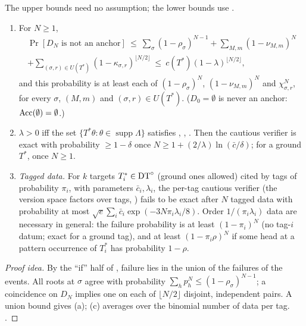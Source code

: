 \begin{theorem}\label{thm:single:rates}
The upper bounds need no assumption; the lower bounds use \Rich.
\begin{enumerate}[label=(\alph*)]
\item For $N\ge1$,
\begin{multline*}
\Pr[D_N\text{ is not an anchor}]\ \le\ \sum_{\sigma}(1-\rho_\sigma)^{N-1}+\sum_{M,m}(1-\nu_{M,m})^N\\
+\sum_{(\sigma,r)\in U(T^*)}(1-\kappa_{\sigma,r})^{\lfloor N/2\rfloor}\ \le\ c(T^*)(1-\lambda)^{\lfloor N/2\rfloor},
\end{multline*}
and this probability is at least each of $(1-\rho_\sigma)^N$, $(1-\nu_{M,m})^N$ and $\chi_{\sigma,r}^N$, for every $\sigma$, $(M,m)$ and $(\sigma,r)\in U(T^*)$. ($D_0=\emptyset$ is never an anchor: $\mathrm{Acc}(\emptyset)=\emptyset$.)
\item $\lambda>0$ iff the set $\{T^*\theta:\theta\in\operatorname{supp}\Lambda\}$ satisfies \evRs, \evN, \evU. Then the cautious verifier is exact with probability $\ge1-\delta$ once $N\ge1+(2/\lambda)\ln(\bar c/\delta)$; for a ground $T^*$, once $N\ge1$.
\item \emph{Tagged data.} For $k$ targets $T^*_i\in\mathrm{DT}^{\circ}$ (ground ones allowed) cited by tags of probability $\pi_i$, with parameters $\bar c_i,\lambda_i$, the per-tag cautious verifier (the version space factors over tags, \citealp{claude2026whatfollows}) fails to be exact after $N$ tagged data with probability at most $\sqrt e\sum_i\bar c_i\exp(-3N\pi_i\lambda_i/8)$. Order $1/(\pi_i\lambda_i)$ data are necessary in general: the failure probability is at least $(1-\pi_i)^N$ (no tag-$i$ datum; exact for a ground tag), and at least $(1-\pi_i\rho)^N$ if some head at a pattern occurrence of $T^*_i$ has probability $1-\rho$.
\end{enumerate}
\end{theorem}

\begin{proof}[Proof idea]
By the ``if'' half of , failure lies in the union of the failures of the events. All roots at $\sigma$ agree with probability $\sum_hp_h^N\le(1-\rho_\sigma)^{N-1}$; a coincidence on $D_N$ implies one on each of $\lfloor N/2\rfloor$ disjoint, independent pairs. A union bound gives (a); (c) averages over the binomial number of data per tag. .
\end{proof}

